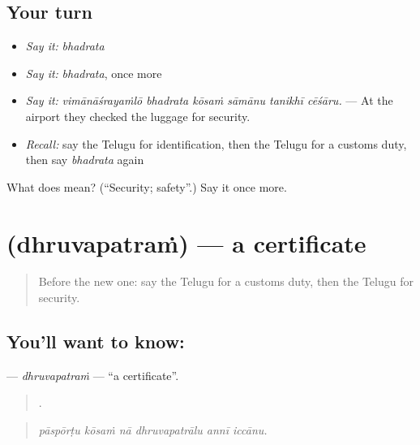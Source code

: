 \subsection*{Your turn}
\begin{itemize}
\raggedright
  \item \emph{Say it:} \emph{bhadrata}
  \item \emph{Say it:} \emph{bhadrata}, once more
  \item \emph{Say it:} \emph{vimānāśrayaṁlō bhadrata kōsaṁ sāmānu tanikhī cēśāru.} — At the airport they checked the luggage for security.
  \item \emph{Recall:} say the Telugu for identification, then the Telugu for a customs duty, then say \emph{bhadrata} again
\end{itemize}

\begin{tcolorbox}[breakable,colback=teal!4,colframe=teal!35!black,title={Before you move on}]
What does  mean? (\textquotedblleft{}Security; safety\textquotedblright{}.) Say it once more.
\end{tcolorbox}
\section[\texorpdfstring{\te{ధ్రువపత్రం} (dhruvapatraṁ)}{ధ్రువపత్రం (dhruvapatraṁ)}]{ (dhruvapatraṁ) — a certificate}

\label{lesson:TE-C441-dhruvapatram}



\begin{quote}
Before the new one: say the Telugu for a customs duty, then the Telugu for security.
\end{quote}

\subsection*{You'll want to know: }
\textbf{} — \emph{dhruvapatraṁ} — \textquotedblleft{}a certificate\textquotedblright{}.

\begin{quote}
     .
\end{quote}

\begin{quote}
\emph{pāspōrṭu kōsaṁ nā dhruvapatrālu annī iccānu.}
\end{quote}

